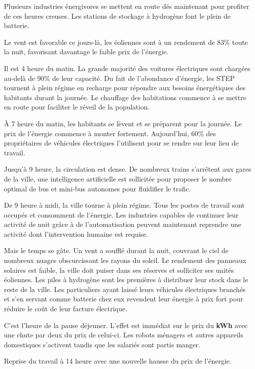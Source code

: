 Plusieurs industries énergivores se mettent en route dés maintenant pour profiter de ces heures creuses.
Les stations de stockage à hydrogène font le plein de batterie.

Le vent est favorable ce jours-là, les éoliennes sont à un rendement de 83\% toute la nuit,
favorisant davantage le faible prix de l'énergie.

Il est 4 heure du matin. La grande majorité des voitures électriques sont chargées au-delà de 90\% de leur capacité.
Du fait de l'abondance d'énergie, les STEP tournent à plein régime en recharge pour répondre aux besoins
énergétiques des habitants durant la journée.
Le chauffage des habitations commence à se mettre en route pour faciliter le réveil de la population.

À 7 heure du matin, les habitants se lèvent et se préparent pour la journée. Le prix de l'énergie commence à monter
fortement. Aujourd'hui, 60\% des propriétaires de véhicules électriques l'utilisent pour se rendre sur leur lieu de travail.

Jusqu'à 9 heure, la circulation est dense. De nombreux trains s'arrêtent aux gares de la ville,
une intelligence artificielle est sollicitée pour proposer le nombre optimal
de bus et mini-bus autonomes pour fluidifier le trafic.

De 9 heure à midi, la ville tourne à plein régime. Tous les postes de travail sont occupés et consomment de l'énergie.
Les industries capables de continuer leur activité de nuit grâce à de l'automatisation peuvent maintenant
reprendre une activité dont l'intervention humaine est requise.

Mais le temps se gâte. Un vent a soufflé durant la nuit, couvrant le ciel de nombreux nuages obscurcissant
les rayons du soleil. Le rendement des panneaux solaires est faible, la ville doit puiser dans
ses réserves et solliciter ses unités éoliennes.
Les piles à hydrogène sont les premières à distribuer leur stock dans le reste de la ville.
Les particuliers ayant laissé leurs véhicules électriques branchés et s'en servant comme batterie chez eux revendent
leur énergie à prix fort pour réduire le coût de leur facture électrique.

C'est l'heure de la pause déjeuner. L'effet est immédiat sur le prix du \textbf{kWh} avec une chute par deux du prix
de celui-ci. Les robots ménagers et autres appareils domestiques s'activent tandis que les salariés sont partis manger.

Reprise du travail à 14 heure avec une nouvelle hausse du prix de l'énergie.


